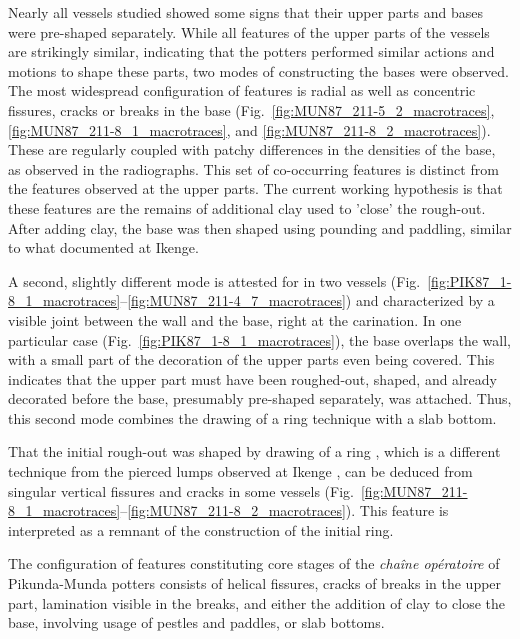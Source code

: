 \documentclass[smallextended,natbib]{svjour3}       %
\begin{document}
Nearly all vessels studied showed some signs that their upper parts and bases were pre-shaped separately. While all features of the upper parts of the vessels are strikingly similar, indicating that the potters performed similar actions and motions to shape these parts, two modes of constructing the bases were observed. The most widespread configuration of features is radial as well as concentric fissures, cracks or breaks in the base (Fig.~\ref{fig:MUN87_211-5_2_macrotraces}, \ref{fig:MUN87_211-8_1_macrotraces}, and \ref{fig:MUN87_211-8_2_macrotraces}). These are regularly coupled with patchy differences in the densities of the base, as observed in the radiographs. This set of co-occurring features is distinct from the features observed at the upper parts. The current working hypothesis is that these features are the remains of additional clay used to 'close' the rough-out. After adding clay, the base was then shaped using pounding and paddling, similar to what \citet{Eggert.1980c} documented at Ikenge.

A second, slightly different mode is attested for in two vessels (Fig.~\ref{fig:PIK87_1-8_1_macrotraces}--\ref{fig:MUN87_211-4_7_macrotraces}) and characterized by a visible joint between the wall and the base, right at the carination. In one particular case (Fig.~\ref{fig:PIK87_1-8_1_macrotraces}), the base overlaps the wall, with a small part of the decoration of the upper parts even being covered. This indicates that the upper part must have been roughed-out, shaped, and already decorated before the base, presumably pre-shaped separately, was attached. Thus, this second mode combines the drawing of a ring technique with a slab bottom.

That the initial rough-out was shaped by drawing of a ring \citep[cf.][]{LivingstoneSmith.2010a}, which is a different technique from the pierced lumps observed at Ikenge \citep{Eggert.1980c}, can be deduced from singular vertical fissures and cracks in some vessels (Fig.~\ref{fig:MUN87_211-8_1_macrotraces}--\ref{fig:MUN87_211-8_2_macrotraces}). This feature is interpreted as a remnant of the construction of the initial ring.

The configuration of features constituting core stages of the \textit{chaîne opératoire} of Pikunda-Munda potters consists of helical fissures, cracks of breaks in the upper part, lamination visible in the breaks, and either the addition of clay to close the base, involving usage of pestles and paddles, or slab bottoms. 
\end{document}
